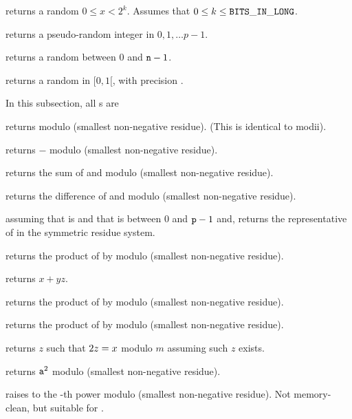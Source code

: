  returns a random $0 \leq x < 2^k$. Assumes
that $0 \leq k \leq {\tt BITS\_IN\_LONG}$.

 returns a pseudo-random integer
in $0, 1, \dots p-1$.

 returns a random  between $0$ and ${\tt n}
- 1$.

 returns a random  in $[0,1[$, with
precision .

 In this subsection, all s are 

 returns  modulo  (smallest
non-negative residue). (This is identical to modii).

 returns $-$ modulo  (smallest
non-negative residue).

 returns the sum of  and
 modulo  (smallest non-negative residue).

 returns the difference of  and
 modulo  (smallest non-negative residue).

 assuming that  is
 and that  is between $0$ and ${\tt p} - 1$ and,
returns the representative of  in the symmetric residue system.

 returns the product of  by
 modulo  (smallest non-negative residue).

 returns $x + yz$.

 returns the product of  by
 modulo  (smallest non-negative residue).

 returns the product of  by
 modulo  (smallest non-negative residue).

 returns $z$ such that $2\*z = x$ modulo
$m$ assuming such $z$ exists.

 returns ${\tt a}^2$ modulo  (smallest
non-negative residue).

 raises  to the -th
power modulo  (smallest non-negative residue). Not memory-clean, but
suitable for .

